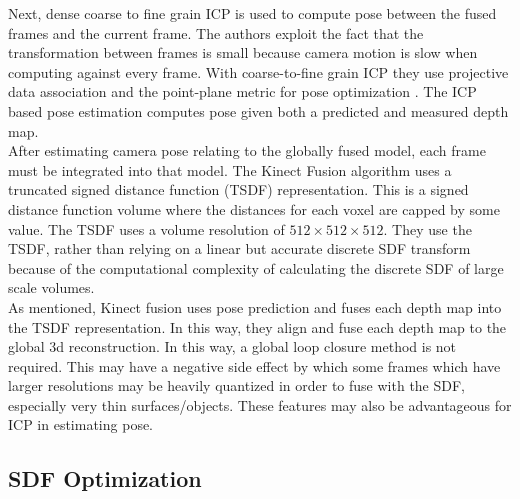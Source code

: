 Next, dense coarse to fine grain ICP is used to compute pose between the fused frames and the current frame. The authors exploit the fact that the transformation between frames is small because camera motion is slow when computing against every frame. With coarse-to-fine grain ICP they use projective data association \cite{Blais95Registering} and the point-plane metric for pose optimization \cite{Rusinkiewicz02Real}. The ICP based pose estimation computes pose given both a predicted and measured depth map. \\

After estimating camera pose relating to the globally fused model, each frame must be integrated into that model. The Kinect Fusion algorithm uses a truncated signed distance function (TSDF) representation. This is a signed distance function volume where the distances for each voxel are capped by some value. The TSDF uses a volume resolution of $512\times 512\times 512$. They use the TSDF, rather than relying on a linear but accurate discrete SDF transform \cite{Rasch09Remarks} because of the computational complexity of calculating the discrete SDF of large scale volumes. \\

As mentioned, Kinect fusion uses pose prediction and fuses each depth map into the TSDF representation. In this way, they align and fuse each depth map to the global 3d reconstruction. In this way, a global loop closure method is not required. This may have a negative side effect by which some frames which have larger resolutions may be heavily quantized in order to fuse with the SDF, especially very thin surfaces/objects. These features may also be advantageous for ICP in estimating pose. 


\subsection{SDF Optimization}

